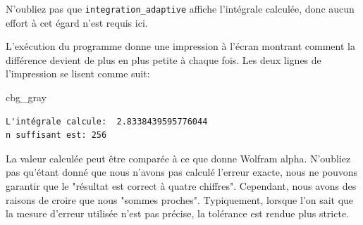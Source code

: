 \documentclass[%
oneside,                 %
final,                   %
10pt,french]{article}
\newenvironment{_cod_tight}[1]{
   \def\FrameCommand{\colorbox{#1}}
   \FrameRule0.6pt\MakeFramed {\FrameRestore}\vskip3mm}
   {\vskip0mm\endMakeFramed}
\newenvironment{cod}[1]{
\bgroup\rmfamily
\fboxsep=0mm\relax
\begin{_cod_tight}{#1}
\list{}{\parsep=-2mm\parskip=0mm\topsep=0pt\leftmargin=2mm
\rightmargin=2\leftmargin\leftmargin=4pt\relax}
\item\relax}
{\endlist\end{_cod_tight}\egroup}
\newenvironment{doconceexercise}{}{}
\begin{document}
\begin{doconceexercise}
N'oubliez pas que \Verb!integration_adaptive! affiche l'intégrale calculée, donc aucun effort à cet égard n'est requis ici.

L'exécution du programme donne une impression à l'écran montrant comment la différence devient de plus en plus petite à chaque fois. Les deux lignes de l'impression se lisent comme suit:
\begin{cod}{cbg_gray}\begin{verbatim}
L'intégrale calcule:  2.8338439595776044
n suffisant est: 256
\end{verbatim}
\end{cod}
\noindent
La valeur calculée peut être comparée à ce que donne Wolfram alpha. N'oubliez pas qu'étant donné que nous n'avons pas calculé l'erreur exacte, nous ne pouvons garantir que le "résultat est correct à quatre chiffres". Cependant, nous avons des raisons de croire que nous "sommes proches". Typiquement, lorsque l'on sait que la mesure d'erreur utilisée n'est pas précise, la tolérance est rendue plus stricte.




\end{doconceexercise}
\end{document}
